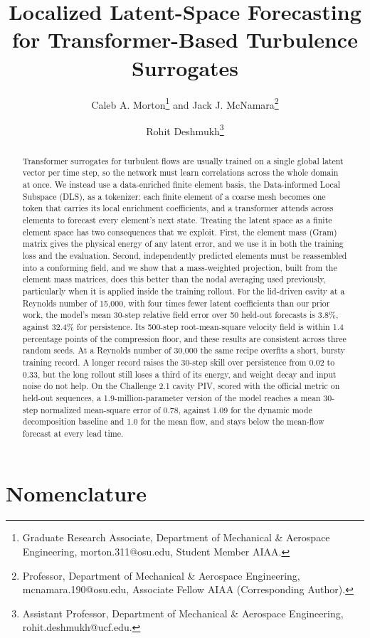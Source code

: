 \documentclass[conf]{new-aiaa}
\title{Localized Latent-Space Forecasting for Transformer-Based Turbulence Surrogates}
\author{Caleb A. Morton\footnote{Graduate Research Associate, Department of Mechanical \& Aerospace Engineering, morton.311@osu.edu, Student Member AIAA.} and Jack J. McNamara\footnote{Professor, Department of Mechanical \& Aerospace Engineering, mcnamara.190@osu.edu, Associate Fellow AIAA (Corresponding Author).}}
\affil{The Ohio State University, Columbus, Ohio, 43210}
\author{Rohit Deshmukh\footnote{Assistant Professor, Department of Mechanical \& Aerospace Engineering, rohit.deshmukh@ucf.edu.}}
\affil{University of Central Florida, Orlando, Florida, 32816}
\begin{document}
\maketitle

\begin{abstract}
Transformer surrogates for turbulent flows are usually trained on a single global latent vector per time step, so the network must learn correlations across the whole domain at once. We instead use a data-enriched finite element basis, the Data-informed Local Subspace (DLS), as a tokenizer: each finite element of a coarse mesh becomes one token that carries its local enrichment coefficients, and a transformer attends across elements to forecast every element's next state. Treating the latent space as a finite element space has two consequences that we exploit. First, the element mass (Gram) matrix gives the physical energy of any latent error, and we use it in both the training loss and the evaluation. Second, independently predicted elements must be reassembled into a conforming field, and we show that a mass-weighted projection, built from the element mass matrices, does this better than the nodal averaging used previously, particularly when it is applied inside the training rollout. For the lid-driven cavity at a Reynolds number of 15,000, with four times fewer latent coefficients than our prior work, the model's mean 30-step relative field error over 50 held-out forecasts is 3.8\%, against 32.4\% for persistence. Its 500-step root-mean-square velocity field is within 1.4 percentage points of the compression floor, and these results are consistent across three random seeds. At a Reynolds number of 30,000 the same recipe overfits a short, bursty training record. A longer record raises the 30-step skill over persistence from 0.02 to 0.33, but the long rollout still loses a third of its energy, and weight decay and input noise do not help. On the Challenge 2.1 cavity PIV, scored with the official metric on held-out sequences, a 1.9-million-parameter version of the model reaches a mean 30-step normalized mean-square error of 0.78, against 1.09 for the dynamic mode decomposition baseline and 1.0 for the mean flow, and stays below the mean-flow forecast at every lead time.
\end{abstract}

\section*{Nomenclature}
\end{document}
